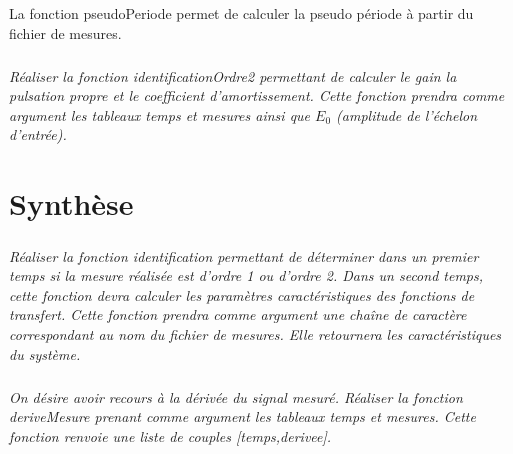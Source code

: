 \documentclass[10pt]{article}
\newif\ifprof
\begin{document}
La fonction \textsf{pseudoPeriode} permet de calculer la pseudo période à partir du fichier de mesures.

\subparagraph{}
\textit{Réaliser la fonction \textsf{identificationOrdre2} permettant de calculer le gain la pulsation propre et le coefficient d'amortissement. Cette fonction prendra comme argument les tableaux \textsf{temps} et \textsf{mesures} ainsi que \textsf{$E_0$} (amplitude de l'échelon d'entrée).}
\ifprof
\begin{corrige}
\begin{py}
\begin{python}
# Fonction à tester
def identificationOrdre2(temps,mesure,E0):
    om0=pseudoPeriode(temps,mesure)
    K = calculGainMoyen(mesure,E0)
    dep = premierDepassement(temps,mesure)
    m = calculAmortissement(dep)
    res=[K,om0,dep]
    return res         
\end{python}
\end{py}
\end{corrige}
\else
\fi


\section{Synthèse}

\subparagraph{}
\textit{Réaliser la fonction \textsf{identification} permettant de déterminer dans un premier temps si la mesure réalisée est d'ordre 1 ou d'ordre 2. Dans un second temps, cette fonction devra calculer les paramètres caractéristiques des fonctions de transfert. Cette fonction prendra comme argument une chaîne de caractère correspondant au nom du fichier de mesures. Elle retournera les caractéristiques du système. }
\ifprof
\begin{corrige}
\begin{py}
\begin{python}
# Fonction à tester
def identification(fichierMesure):
    temps,mesure=traitementDonnees(fichierMesure)
    ord = ordre(temps,mesures)
    if ord == 1 :
        return identificationOrdre1(temps,mesure)
    elif ord == 2 :
        return identificationOrdre2(temps,mesure)
    else : 
        return False
\end{python}
\end{py}
\end{corrige}
\else
\fi

\subparagraph{}
\textit{On désire avoir recours à la dérivée du signal mesuré. Réaliser la fonction \textsf{deriveMesure} prenant comme argument les tableaux \textsf{temps} et \textsf{mesures}. Cette fonction renvoie une liste de couples \textsf{[temps,derivee]}.}
\end{document}
